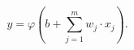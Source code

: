 \begin{equation}
y = \varphi(b + \sum_{j = 1}^{m}{w_j \cdot x_j}).
 \label{eq:perceptron}
\end{equation}
